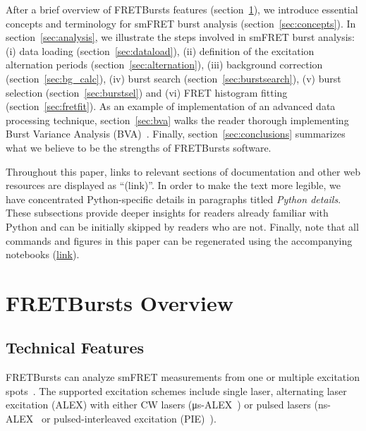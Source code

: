 \documentclass[10pt,letterpaper]{article}
\begin{document}
After a brief overview of FRETBursts features (section~\ref{sec:overview}),
we introduce essential concepts and terminology for smFRET burst analysis 
(section~\ref{sec:concepts}).
In section~\ref{sec:analysis}, we illustrate the steps involved
in smFRET burst analysis: (i) data loading (section~\ref{sec:dataload}), 
(ii) definition of the excitation alternation periods 
(section~\ref{sec:alternation}), (iii) background correction 
(section~\ref{sec:bg_calc}), (iv) burst search 
(section~\ref{sec:burstsearch}),
(v) burst selection (section~\ref{sec:burstsel}) and 
(vi) FRET histogram fitting (section~\ref{sec:fretfit}).
As an example 
of implementation of an advanced data processing technique,
section~\ref{sec:bva} walks the reader thorough implementing
Burst Variance Analysis (BVA)~\cite{Torella_2011}.
Finally, section~\ref{sec:conclusions} summarizes what we believe 
to be the strengths of FRETBursts software.

Throughout this paper,
links to relevant sections of documentation and other web resources
are displayed as ``(link)''.
In order to make the text more legible,
we have concentrated Python-specific details in paragraphs titled
\textit{Python details}. These subsections provide deeper insights for readers
already familiar with Python and can be initially skipped by readers who are not.
Finally, note that all commands and figures in this paper can be regenerated 
using the accompanying notebooks
(\href{https://github.com/tritemio/fretbursts_paper}{link}).


\section{FRETBursts Overview}
\label{sec:overview}

\subsection{Technical Features}

FRETBursts can analyze smFRET measurements
from one or multiple excitation spots~\cite{Ingargiola_2013}. The supported
excitation schemes include single laser, alternating laser excitation (ALEX)
with either CW lasers (μs-ALEX~\cite{Kapanidis_2005})
or pulsed lasers (ns-ALEX~\cite{Laurence_2005} or
pulsed-interleaved excitation (PIE)~\cite{M_ller_2005}).
\end{document}
